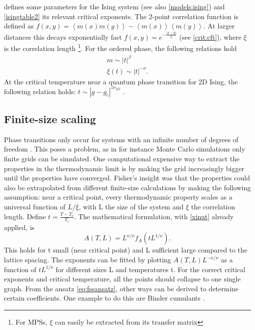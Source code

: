  defines some parameters for the Ising system (see also \cref{models:ising}) and \cref{isingtable2} its relevant critical  exponents. The 2-point correlation function is defined as $ f( x,y) =  \left < m(x) m(y) \right > -  \left<m(x) \right> \left<m(y) \right> $. At larger distances this decays exponentially fast $ f(  x,y ) = e^{ -\frac{ |x-y|}{ \xi} } $ (see \cref{crit:cft}), where $\xi$ is the correlation length \footnote{For \Glspl{MPS}, $\xi$ can easily be extracted from its transfer matrix}. For the ordered phase, the following relations hold \cite{Odor2004}
\begin{align}
  m \sim |t|^{\beta} \\
  \xi(t) \sim |t|^{-\nu} \label{xinut} .
\end{align}
At the critical temperature near a quantum phase transition for 2D Ising, the following relation holds: $ t \sim |g-g_c|^{z \nu_{3D}} $ \cite{Hesselmann2016}.

\subsection{Finite-size scaling}\label{subsec:fss}

Phase transitions only occur for systems with an infinite number of degrees of freedom \cite{Kadanoff2010}. This poses a problem, as in for instance Monte Carlo simulations only finite grids can be simulated. One computational expensive way to extract the properties in the thermodynamic limit is by making the grid increasingly bigger until the properties have converged. Fisher's  insight was that the properties could also be extrapolated from different finite-size calculations \cite{Fisher1967} by making the following assumption: near a critical point, every thermodynamic property scales as a universal function of $L/\xi$, with L the size of the system and $\xi$ the correlation length. Define $t=\frac{T-T_c}{T_c}$. The mathematical formulation, with \cref{xinut} already applied, is \cite{Beach2005}
\begin{equation}\label{eq:fssansatz}
  A(T,L) = L^{\kappa / \nu} f_A( t L ^{1/ \nu} ).
\end{equation}
This holds for t small (near critical point) and L sufficient large compared to the lattice spacing. The exponents can be fitted by plotting $A(T,L)  L^{-\kappa / \nu} $ as a function of $t L ^{1/ \nu}$ for different sizes L and temperatures t. For the correct critical exponents and critical temperature, all the points should collapse to one single graph. From the ansatz \cref{eq:fssansatz}, other ways can be derived to determine certain coefficients. One example to do this are Binder cumulants \cite{Hesselmann2016}.

